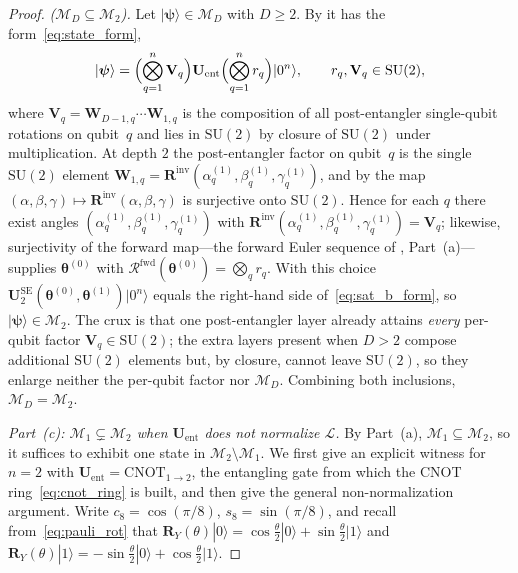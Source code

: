 \documentclass[10pt,a4paper]{amsart}
\newcommand{\CNOT}{\mathrm{CNOT}}
\newcommand{\SU}{\mathrm{SU}}
\newcommand{\cM}{\mathcal{M}}
\begin{document}
\begin{proof}
\emph{($\cM_D\subseteq\cM_2$).} Let $|\boldsymbol{\psi}\rangle\in\cM_D$ with
$D\ge 2$. By  it has the form~\eqref{eq:state_form},
\begin{equation}\label{eq:sat_b_form}
  |\boldsymbol{\psi}\rangle
  = \Bigl(\bigotimes_{q=1}^n \mathbf{V}_q\Bigr) \mathbf{U}_{\mathrm{ent}} 
    \Bigl(\bigotimes_{q=1}^n r_q\Bigr)|0^n\rangle,
  \qquad r_q,\mathbf{V}_q\in\SU(2),
\end{equation}
where $\mathbf{V}_q=\mathbf{W}_{D-1,q}\cdots\mathbf{W}_{1,q}$ is the composition of all
post-entangler single-qubit rotations on qubit~$q$ and lies in $\SU(2)$
by closure of $\SU(2)$ under multiplication. At depth $2$ the
post-entangler factor on qubit~$q$ is the single $\SU(2)$ element
$\mathbf{W}_{1,q}=\mathbf{R}^{\mathrm{inv}}(\alpha_q^{(1)},\beta_q^{(1)},\gamma_q^{(1)})$,
and by  the map
$(\alpha,\beta,\gamma)\mapsto\mathbf{R}^{\mathrm{inv}}(\alpha,\beta,\gamma)$ is
surjective onto $\SU(2)$. Hence for each $q$ there exist angles
$(\alpha_q^{(1)},\beta_q^{(1)},\gamma_q^{(1)})$ with
$\mathbf{R}^{\mathrm{inv}}(\alpha_q^{(1)},\beta_q^{(1)},\gamma_q^{(1)})=\mathbf{V}_q$;
likewise, surjectivity of the forward map---the forward Euler
sequence of , Part~(a)---supplies
$\bm\theta^{(0)}$ with
$\mathcal{R}^{\mathrm{fwd}}(\bm\theta^{(0)})=\bigotimes_q r_q$. With this
choice $\mathbf{U}_2^{\mathrm{SE}}(\bm\theta^{(0)},\bm\theta^{(1)})|0^n\rangle$
equals the right-hand side of~\eqref{eq:sat_b_form}, so
$|\boldsymbol{\psi}\rangle\in\cM_2$. The crux is that one post-entangler layer
already attains \emph{every} per-qubit factor $\mathbf{V}_q\in\SU(2)$; the extra
layers present when $D>2$ compose additional $\SU(2)$ elements but,
by closure, cannot leave $\SU(2)$, so they enlarge neither the per-qubit
factor nor $\cM_D$. Combining both inclusions, $\cM_D=\cM_2$.

\textit{Part~(c): $\cM_1\subsetneq\cM_2$ when $\mathbf{U}_{\mathrm{ent}}$ does
not normalize $\mathcal{L}$.}
By Part~(a), $\cM_1\subseteq\cM_2$, so it suffices to exhibit one state
in $\cM_2\setminus\cM_1$. We first give an explicit witness for $n=2$
with $\mathbf{U}_{\mathrm{ent}}=\CNOT_{1\to2}$, the entangling gate from which
the CNOT ring~\eqref{eq:cnot_ring} is built, and then give the general
non-normalization argument. Write
$c_8=\cos(\pi/8)$, $s_8=\sin(\pi/8)$, and recall from~\eqref{eq:pauli_rot}
that $\mathbf{R}_Y(\theta)|0\rangle=\cos\tfrac\theta2|0\rangle
+\sin\tfrac\theta2|1\rangle$ and
$\mathbf{R}_Y(\theta)|1\rangle=-\sin\tfrac\theta2|0\rangle
+\cos\tfrac\theta2|1\rangle$.


\end{proof}
\end{document}
